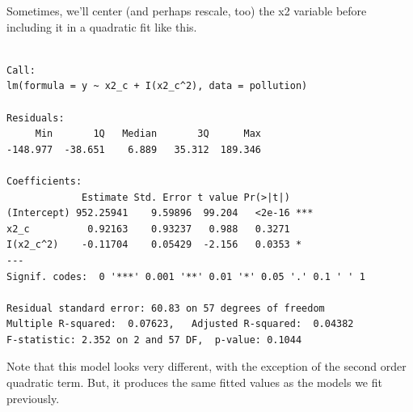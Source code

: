 \documentclass[]{book}
\newenvironment{Shaded}{\begin{snugshade}}{\end{snugshade}}
\newcommand{\KeywordTok}[1]{\textcolor[rgb]{0.13,0.29,0.53}{\textbf{#1}}}
\newcommand{\DataTypeTok}[1]{\textcolor[rgb]{0.13,0.29,0.53}{#1}}
\newcommand{\DecValTok}[1]{\textcolor[rgb]{0.00,0.00,0.81}{#1}}
\newcommand{\StringTok}[1]{\textcolor[rgb]{0.31,0.60,0.02}{#1}}
\newcommand{\OperatorTok}[1]{\textcolor[rgb]{0.81,0.36,0.00}{\textbf{#1}}}
\newcommand{\NormalTok}[1]{#1}
\theoremstyle{definition}
\theoremstyle{definition}
\theoremstyle{definition}
\theoremstyle{remark}
\begin{document}
Sometimes, we'll center (and perhaps rescale, too) the x2 variable
before including it in a quadratic fit like this.

\begin{Shaded}
\end{Shaded}

\begin{verbatim}

Call:
lm(formula = y ~ x2_c + I(x2_c^2), data = pollution)

Residuals:
     Min       1Q   Median       3Q      Max 
-148.977  -38.651    6.889   35.312  189.346 

Coefficients:
             Estimate Std. Error t value Pr(>|t|)    
(Intercept) 952.25941    9.59896  99.204   <2e-16 ***
x2_c          0.92163    0.93237   0.988   0.3271    
I(x2_c^2)    -0.11704    0.05429  -2.156   0.0353 *  
---
Signif. codes:  0 '***' 0.001 '**' 0.01 '*' 0.05 '.' 0.1 ' ' 1

Residual standard error: 60.83 on 57 degrees of freedom
Multiple R-squared:  0.07623,   Adjusted R-squared:  0.04382 
F-statistic: 2.352 on 2 and 57 DF,  p-value: 0.1044
\end{verbatim}

Note that this model looks very different, with the exception of the
second order quadratic term. But, it produces the same fitted values as
the models we fit previously.

\begin{Shaded}
\end{Shaded}
\end{document}
